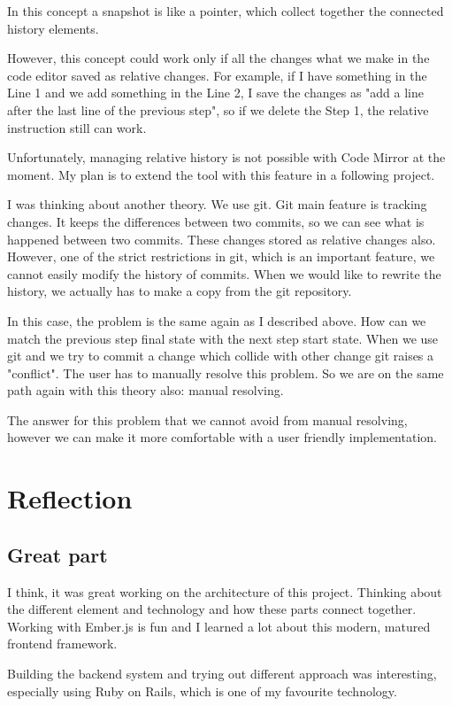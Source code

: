 \documentclass[12pt, a4paper, oneside, openright, medskipamount]{report}
\begin{document}
In this concept a snapshot is like a pointer, which collect together the connected history elements.

However, this concept could work only if all the changes what we make in the code editor saved as relative changes. For example, if I have something in the Line 1 and we add something in the Line 2, I save the changes as "add a line after the last line of the previous step", so if we delete the Step 1, the relative instruction still can work.

Unfortunately, managing relative history is not possible with Code Mirror at the moment. My plan is to extend the tool with this feature in a following project.

I was thinking about another theory. We use git. Git main feature is tracking changes. It keeps the differences between two commits, so we can see what is happened between two commits. These changes stored as relative changes also. However, one of the strict restrictions in git, which is an important feature, we cannot easily modify the history of commits. When we would like to rewrite the history, we actually has to make a copy from the git repository.

In this case, the problem is the same again as I described above. How can we match the previous step final state with the next step start state. When we use git and we try to commit a change which collide with other change git raises a "conflict". The user has to manually resolve this problem. So we are on the same path again with this theory also: manual resolving.

The answer for this problem that we cannot avoid from manual resolving, however we can make it more comfortable with a user friendly implementation.

\section{Reflection}

\subsection{Great part}

I think, it was great working on the architecture of this project. Thinking about the different element and technology and how these parts connect together. Working with Ember.js is fun and I learned a lot about this modern, matured frontend framework.

Building the backend system and trying out different approach was interesting, especially using Ruby on Rails, which is one of my favourite technology.
\end{document}
